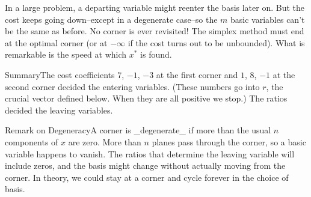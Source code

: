 In a large problem, a departing variable might reenter the basis later on. But the cost keeps going down--except in a degenerate case--so the \(m\) basic variables can't be the same as before. No corner is ever revisited! The simplex method must end at the optimal corner (or at \(-\infty\) if the cost turns out to be unbounded). What is remarkable is the speed at which \(x^{*}\) is found.

SummaryThe cost coefficients \(7\), \(-1\), \(-3\) at the first corner and \(1\), \(8\), \(-1\) at the second corner decided the entering variables. (These numbers go into \(r\), the crucial vector defined below. When they are all positive we stop.) The ratios decided the leaving variables.

Remark on DegeneracyA corner is _degenerate_ if more than the usual \(n\) components of \(x\) are zero. More than \(n\) planes pass through the corner, so a basic variable happens to vanish. The ratios that determine the leaving variable will include zeros, and the basis might change without actually moving from the corner. In theory, we could stay at a corner and cycle forever in the choice of basis.

 
